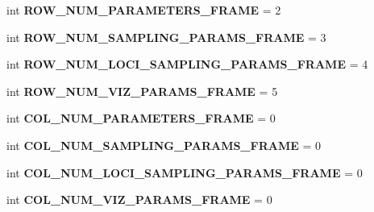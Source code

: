 \begin{DoxyCompactItemize}
\item 
int {\bfseries R\+O\+W\+\_\+\+N\+U\+M\+\_\+\+P\+A\+R\+A\+M\+E\+T\+E\+R\+S\+\_\+\+F\+R\+A\+ME} = 2\hypertarget{namespacenegui_1_1pgguineestimator_a65e1a3009c36c07576ad0e8f4088e556}{}\label{namespacenegui_1_1pgguineestimator_a65e1a3009c36c07576ad0e8f4088e556}

\item 
int {\bfseries R\+O\+W\+\_\+\+N\+U\+M\+\_\+\+S\+A\+M\+P\+L\+I\+N\+G\+\_\+\+P\+A\+R\+A\+M\+S\+\_\+\+F\+R\+A\+ME} = 3\hypertarget{namespacenegui_1_1pgguineestimator_a597ecbcf655acc9bc9602152e5e013a8}{}\label{namespacenegui_1_1pgguineestimator_a597ecbcf655acc9bc9602152e5e013a8}

\item 
int {\bfseries R\+O\+W\+\_\+\+N\+U\+M\+\_\+\+L\+O\+C\+I\+\_\+\+S\+A\+M\+P\+L\+I\+N\+G\+\_\+\+P\+A\+R\+A\+M\+S\+\_\+\+F\+R\+A\+ME} = 4\hypertarget{namespacenegui_1_1pgguineestimator_ade631ac9ad3760baa01c031b44d008e0}{}\label{namespacenegui_1_1pgguineestimator_ade631ac9ad3760baa01c031b44d008e0}

\item 
int {\bfseries R\+O\+W\+\_\+\+N\+U\+M\+\_\+\+V\+I\+Z\+\_\+\+P\+A\+R\+A\+M\+S\+\_\+\+F\+R\+A\+ME} = 5\hypertarget{namespacenegui_1_1pgguineestimator_ac57b4f4a55ea7d20c27fa2f8f92febe7}{}\label{namespacenegui_1_1pgguineestimator_ac57b4f4a55ea7d20c27fa2f8f92febe7}

\item 
int {\bfseries C\+O\+L\+\_\+\+N\+U\+M\+\_\+\+P\+A\+R\+A\+M\+E\+T\+E\+R\+S\+\_\+\+F\+R\+A\+ME} = 0\hypertarget{namespacenegui_1_1pgguineestimator_af5a6a0307a035cfdb76aef3797519dd3}{}\label{namespacenegui_1_1pgguineestimator_af5a6a0307a035cfdb76aef3797519dd3}

\item 
int {\bfseries C\+O\+L\+\_\+\+N\+U\+M\+\_\+\+S\+A\+M\+P\+L\+I\+N\+G\+\_\+\+P\+A\+R\+A\+M\+S\+\_\+\+F\+R\+A\+ME} = 0\hypertarget{namespacenegui_1_1pgguineestimator_a03c80bf4fdae72d614f75bcd415b4c3d}{}\label{namespacenegui_1_1pgguineestimator_a03c80bf4fdae72d614f75bcd415b4c3d}

\item 
int {\bfseries C\+O\+L\+\_\+\+N\+U\+M\+\_\+\+L\+O\+C\+I\+\_\+\+S\+A\+M\+P\+L\+I\+N\+G\+\_\+\+P\+A\+R\+A\+M\+S\+\_\+\+F\+R\+A\+ME} = 0\hypertarget{namespacenegui_1_1pgguineestimator_aafb5fee2d0c5edf9f679b83a1969048c}{}\label{namespacenegui_1_1pgguineestimator_aafb5fee2d0c5edf9f679b83a1969048c}

\item 
int {\bfseries C\+O\+L\+\_\+\+N\+U\+M\+\_\+\+V\+I\+Z\+\_\+\+P\+A\+R\+A\+M\+S\+\_\+\+F\+R\+A\+ME} = 0\hypertarget{namespacenegui_1_1pgguineestimator_a2d9f6b4cfcc3822fe2d5116bd2bfa881}{}\label{namespacenegui_1_1pgguineestimator_a2d9f6b4cfcc3822fe2d5116bd2bfa881}


\end{DoxyCompactItemize}
